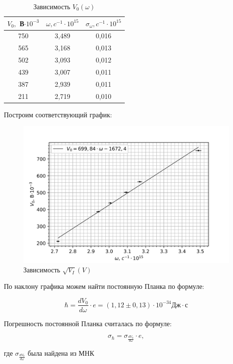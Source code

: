 \documentclass[a4paper,12pt]{report}
\begin{document}
\begin{table}[H]
\begin{tabular}{|c|c|c|}
\hline
$V_{0},$ В$\cdot 10^{-3}$  & $\omega, c^{-1} \cdot 10^{15}$ & $\sigma_{\omega}, c^{-1} \cdot 10^{15}$ \\ \hline
750 & 3,489 & 0,016       \\ \hline
565 & 3,168 & 0,013       \\ \hline
502 & 3,093 & 0,012       \\ \hline
439 & 3,007 & 0,011       \\ \hline
387 & 2,939 & 0,011       \\ \hline
211 & 2,719 & 0,010       \\ \hline
\end{tabular}
\caption{Зависимость $V_{0}(\omega)$}
\end{table}

Построим соответствующий график:

	\begin{figure}[H]
		\centering
		\includegraphics[width=0.7\linewidth]{V_0(omega).png}
		\caption{Зависимость $\sqrt{V_{I}}(V)$}
	\end{figure}

По наклону графика можем найти постоянную Планка по формуле:

\begin{equation*}
    \hbar = \frac{dV_{0}}{d\omega}\cdot e = (1,12 \pm 0,13)\cdot 10^{-34} \text{Дж}\cdot\text{с}
\end{equation*}

Погрешность постоянной Планка считалась по формуле:

\begin{equation*}
    \sigma_{\hbar} = \sigma_{\frac{dV_{0}}{d\omega}}\cdot e,
\end{equation*}

где $\sigma_{\frac{dV_{0}}{d\omega}}$ была найдена из МНК
\end{document}
